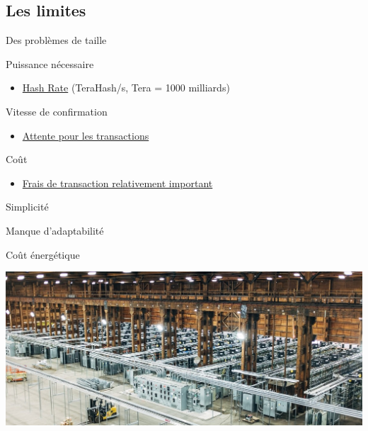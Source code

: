 \documentclass[presentation]{beamer}
\begin{document}
\subsection{Les limites}
\label{sec:org2286b02}
\begin{frame}[label={sec:orgc06464b}]{Des problèmes de taille}
\begin{block}{Puissance nécessaire}
\begin{itemize}
\item \href{https://www.blockchain.com/fr/charts/hash-rate}{Hash Rate}  (TeraHash/s, Tera = 1000 milliards)
\end{itemize}
\end{block}
\begin{block}{Vitesse de confirmation}
\begin{itemize}
\item \href{https://www.blockchain.com/explorer/charts/median-confirmation-time}{Attente pour les transactions}
\end{itemize}
\end{block}
\begin{block}{Coût}
\begin{itemize}
\item \href{https://www.blockchain.com/explorer/charts/fees-usd-per-transaction}{Frais de transaction relativement important}
\end{itemize}
\end{block}

\begin{block}{Simplicité}
\end{block}
\begin{block}{Manque d'adaptabilité}
\end{block}
\end{frame}

\begin{frame}[label={sec:org568f4f1}]{Coût énergétique}
\begin{center}
\includegraphics[width=\textwidth]{Pictures/mining-farm-bitcoin.jpg}
\end{center}
\end{frame}
\end{document}
